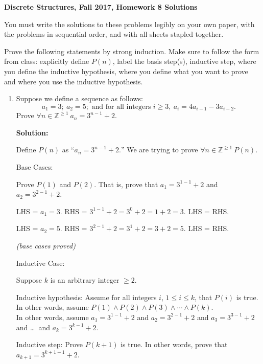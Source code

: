 \documentclass[11pt, letterpaper]{report}
\newcommand{\Z}{\mathbb{Z}}
\begin{document}
{\textbf{Discrete Structures, Fall 2017, Homework 8 Solutions}}

\bigskip

You must write the solutions to these problems legibly on your own paper, with
the problems in sequential order, and with all sheets stapled together.

\bigskip

Prove the following statements by strong induction.  Make sure to follow the form from class:
explicitly define $P(n)$, label the basis step(s), inductive step, where you define the inductive hypothesis, where you define what you want to prove
and where you use the inductive hypothesis.  
\begin{enumerate}

\item Suppose we define a sequence as follows: 
$$
a_1 = 3; \ a_2 = 5; \text{ and for all integers }i \geq 3, \ a_i = 4a_{i-1} -3a_{i-2}. 
$$
Prove $\forall n \in \Z^{\geq 1} \ a_n = 3^{n-1}+2.$

\textbf{Solution:}

Define $P(n)$ as ``$a_n = 3^{n-1}+2.$''  We are trying to prove $\forall n \in \Z^{\geq 1} \ P(n)$.

Base Cases:

Prove $P(1)$ and $P(2)$.  That is, prove that $a_1 = 3^{1-1}+2$ and $a_2 = 3^{2-1}+2$.

LHS = $a_1 = 3$.  RHS = $3^{1-1}+2 = 3^0+2 = 1+2=3$.  LHS = RHS. \ \ \checkmark 

LHS = $a_2 = 5$.  RHS = $3^{2-1}+2 = 3^1+2 = 3+2=5$.  LHS = RHS. \ \ \checkmark 

\textit{(base cases proved)}

Inductive Case:

Suppose $k$ is an arbitrary integer $\geq 2$.

Inductive hypothesis: Assume for all integers $i$, $1 \leq i \leq k$, that $P(i)$ is true.\\
In other words, assume $P(1) \land P(2) \land P(3) \land \cdots \land P(k)$.\\
In other words, assume $a_1 = 3^{1-1}+2$ and $a_2 = 3^{2-1}+2$ and $a_3 = 3^{3-1}+2$ and \ldots\ and $a_k = 3^{k-1}+2$.

Inductive step: Prove $P(k+1)$ is true.  In other words, prove that $a_{k+1} = 3^{k+1-1}+2$.


\end{enumerate}
\end{document}
